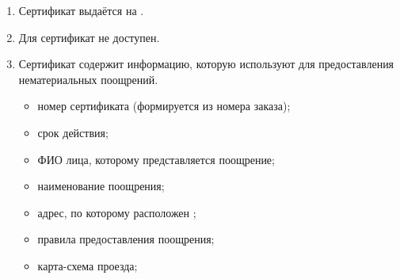                 \begin{enumerate}
                    \item Сертификат выдаётся на .
                    \item Для  сертификат не доступен.
                    \item Сертификат содержит информацию, которую
                         используют для предоставления
                        нематериальных поощрений.
                        \begin{itemize}
                            \item номер сертификата (формируется из номера
                            заказа);
                            \item срок действия;
                            \item ФИО лица, которому представляется поощрение;
                            \item наименование поощрения;
                            \item адрес, по которому расположен
                                ;
                            \item правила предоставления поощрения;
                            \item карта-схема проезда;
                        \end{itemize}
                \end{enumerate}

